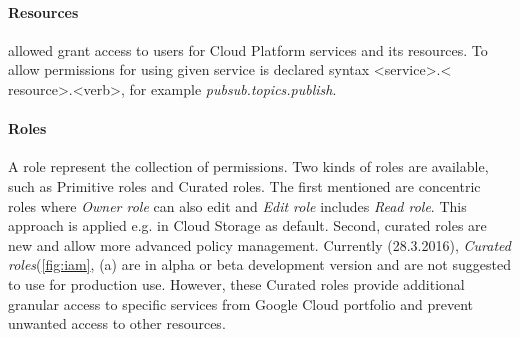 \documentclass[a4paper,12pt,oneside]{report}
\begin{document}
	\paragraph{Resources} allowed grant access to users for Cloud Platform services
	and its resources. To allow permissions for using given 
	service is declared syntax \textless service\textgreater.\textless
	resource\textgreater.\textless verb\textgreater, for example
	\emph{pubsub.topics.publish}.
	
	\paragraph{Roles} A role represent the collection of permissions. Two kinds of
	roles 
	are available, such as Primitive roles and Curated roles. The first mentioned
	are concentric 
	roles where \textit{Owner role} can also edit and \textit{Edit role} includes 
	\textit{Read role}. This approach is applied e.g. in Cloud Storage as default.
	Second, 
	curated roles are new and allow more advanced policy management. 
	Currently (28.3.2016), \textit{Curated roles}(\ref{fig:iam}, (a) are in alpha or
	beta 
	development version and are not suggested to use for production 
	use. However, these Curated roles provide additional granular access to specific
	services 
	from Google Cloud portfolio and prevent unwanted access to 
	other resources. 
\end{document}
